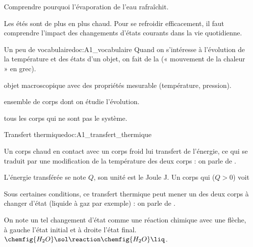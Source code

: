 \teteSndTran

\vspace*{-40pt}

\begin{objectifs}
  \item Comprendre pourquoi l'évaporation de l'eau rafraîchit.
\end{objectifs}

\begin{contexte}
  Les étés sont de plus en plus chaud. Pour se refroidir efficacement, il faut comprendre l'impact des changements d'états courants dans la vie quotidienne.
  
\end{contexte}


\begin{doc}{Un peu de vocabulaire}{doc:A1_vocabulaire}
  Quand on s'intéresse à l'évolution de la température et des états d'un objet, on fait de la  (« mouvement de la chaleur » en grec).
  
  \begin{importants}
    \begin{listePoints}
      \item {} objet macroscopique avec des propriétés mesurable (température, pression).
      \item {} ensemble de corps dont on étudie l'évolution.
      \item {} tous les corps qui ne sont pas le système.
    \end{listePoints}
  \end{importants}
\end{doc}

\begin{doc}{Transfert thermique}{doc:A1_transfert_thermique}
  \begin{importants}
    Un corps chaud en contact avec un corps froid lui transfert de l'énergie, ce qui se traduit par une modification de la température des deux corps : on parle de .
  \end{importants}
  L'énergie transférée se note $Q$, son unité est le Joule \unit{\joule}.
  Un corps qui  ($Q > 0$) voit 
  
  
  \begin{importants}
    Sous certaines conditions, ce transfert thermique peut mener un des deux corps à changer d'état (liquide à gaz par exemple) : on parle de .
  \end{importants}
  On note un tel changement d'état comme une réaction chimique avec une flèche, à gauche l'état initial et à droite l'état final.
  \exemple $\chemfig{H_2O}\sol \reaction \chemfig{H_2O}\liq$.
\end{doc}

